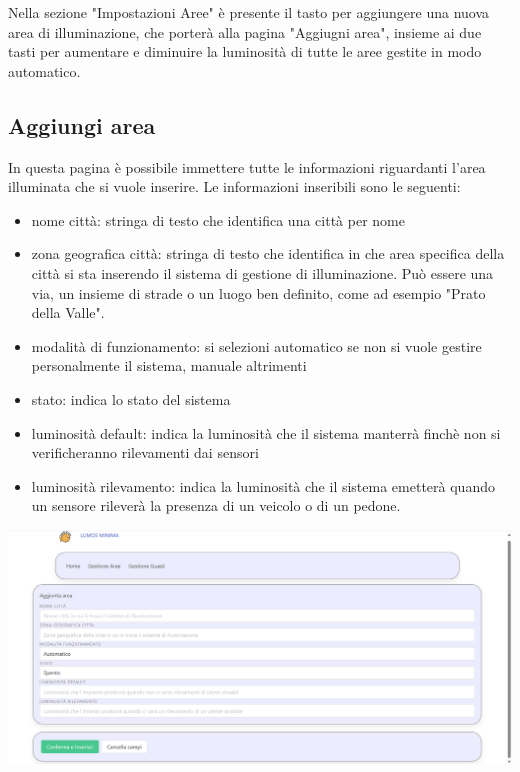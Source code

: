 \documentclass[9pt]{article}
\begin{document}
Nella sezione "Impostazioni Aree" è presente il tasto per aggiungere una nuova area di illuminazione, che porterà alla pagina "Aggiugni area", insieme ai due tasti per aumentare e diminuire la luminosità di tutte le aree gestite in modo automatico.

\subsection{Aggiungi area}

In questa pagina è possibile immettere tutte le informazioni riguardanti l'area illuminata che si vuole inserire.
Le informazioni inseribili sono le seguenti:
\begin{itemize}
	\item nome città: stringa di testo che identifica una città per nome
	\item zona geografica città: stringa di testo che identifica in che area specifica della città si sta inserendo il sistema di gestione di illuminazione. Può essere una via, un insieme di strade o un luogo ben definito, come ad esempio "Prato della Valle".
	\item modalità di funzionamento: si selezioni automatico se non si vuole gestire personalmente il sistema, manuale altrimenti
	\item stato: indica lo stato del sistema
	\item luminosità default: indica la luminosità che il sistema manterrà finchè non si verificheranno rilevamenti dai sensori
	\item luminosità rilevamento: indica la luminosità che il sistema emetterà quando un sensore rileverà la presenza di un veicolo o di un pedone.
\end{itemize}


\begin{center}
	\includegraphics[scale=0.3]{Aggiungi_area.png}
\end{center}
\end{document}
